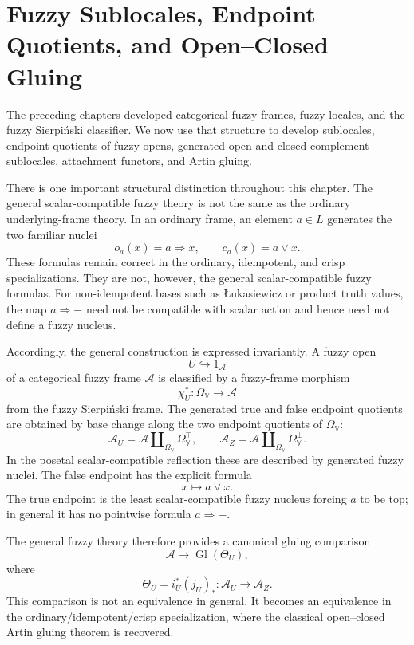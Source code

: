 \chapter{Fuzzy Sublocales, Endpoint Quotients, and Open--Closed Gluing}
\label{ch:fuzzy-sublocales-open-closed-gluing}

The preceding chapters developed categorical fuzzy frames, fuzzy locales, and
the fuzzy Sierpiński classifier.  We now use that structure to develop
sublocales, endpoint quotients of fuzzy opens, generated open and
closed-complement sublocales, attachment functors, and Artin gluing.

There is one important structural distinction throughout this chapter.  The
general scalar-compatible fuzzy theory is not the same as the ordinary
underlying-frame theory.  In an ordinary frame, an element \(a\in L\) generates
the two familiar nuclei
\[
    o_a(x)=a\Rightarrow x,
    \qquad
    c_a(x)=a\vee x.
\]
These formulas remain correct in the ordinary, idempotent, and crisp
specializations.  They are not, however, the general scalar-compatible fuzzy
formulas.  For non-idempotent bases such as Łukasiewicz or product truth values,
the map \(a\Rightarrow-\) need not be compatible with scalar action and hence
need not define a fuzzy nucleus.

Accordingly, the general construction is expressed invariantly.  A fuzzy open
\[
    U\hookrightarrow 1_{\mathcal A}
\]
of a categorical fuzzy frame \(\mathcal A\) is classified by a fuzzy-frame
morphism
\[
    \chi_U^\ast:\Omega_{\mathbb V}\to\mathcal A
\]
from the fuzzy Sierpiński frame.  The generated true and false endpoint
quotients are obtained by base change along the two endpoint quotients of
\(\Omega_{\mathbb V}\):
\[
    \mathcal A_U
    =
    \mathcal A\amalg_{\Omega_{\mathbb V}}\Omega_{\mathbb V}^{\top},
    \qquad
    \mathcal A_Z
    =
    \mathcal A\amalg_{\Omega_{\mathbb V}}\Omega_{\mathbb V}^{\bot}.
\]
In the posetal scalar-compatible reflection these are described by generated
fuzzy nuclei.  The false endpoint has the explicit formula
\[
    x\longmapsto a\vee x.
\]
The true endpoint is the least scalar-compatible fuzzy nucleus forcing \(a\) to
be top; in general it has no pointwise formula \(a\Rightarrow-\).

The general fuzzy theory therefore provides a canonical gluing comparison
\[
    \mathcal A\longrightarrow \operatorname{Gl}(\Theta_U),
\]
where
\[
    \Theta_U=i_U^\ast(j_U)_\ast:
    \mathcal A_U\to\mathcal A_Z.
\]
This comparison is not an equivalence in general.  It becomes an equivalence in
the ordinary/idempotent/crisp specialization, where the classical
open--closed Artin gluing theorem is recovered.

